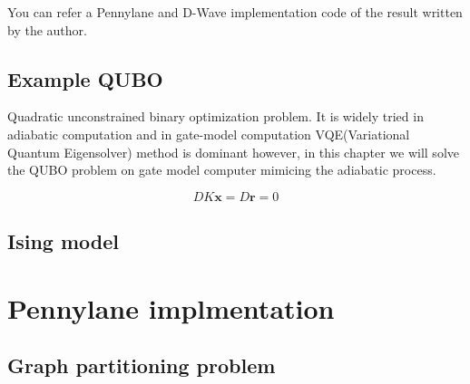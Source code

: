 You can refer a Pennylane and D-Wave implementation code of the result written by the author\cite{Kim_adiabatic_implementation}.

\subsection{Example QUBO}

Quadratic unconstrained binary optimization problem.
It is widely tried in adiabatic computation and 
in gate-model computation VQE(Variational Quantum Eigensolver) method is 
dominant however, in this chapter we will solve the 
QUBO problem on gate model computer mimicing the adiabatic process.




\begin{equation}
    D K \mathbf{x} = D \mathbf{r} = 0
\end{equation}





\subsection{Ising model}

\section{Pennylane implmentation}

\subsection{Graph partitioning problem}




